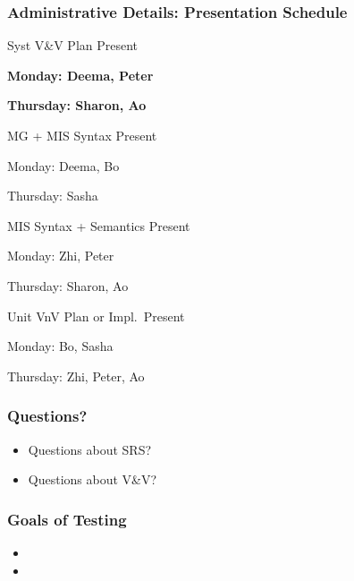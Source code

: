 \documentclass[t,12pt,numbers,fleqn]{beamer}
\begin{document}
\begin{frame}
\frametitle{Administrative Details: Presentation Schedule}

\bi
\item Syst V\&V Plan Present
\bi
\item \textbf{Monday: Deema, Peter}
\item \textbf{Thursday: Sharon, Ao}
\ei
\item MG + MIS Syntax Present
\bi
\item Monday:  Deema, Bo
\item Thursday: Sasha
\ei
\item MIS Syntax + Semantics Present
\bi
\item Monday: Zhi, Peter
\item Thursday:  Sharon, Ao
\ei
\item Unit VnV Plan or Impl.\ Present
\bi
\item Monday: Bo, Sasha
\item Thursday: Zhi, Peter, Ao
\ei
\ei

\end{frame}


\begin{frame}
\frametitle{Questions?}
\begin{itemize}
\item Questions about SRS?
\item Questions about V\&V?
\end{itemize}
\end{frame}


\begin{frame}
\frametitle{Goals of Testing}

\begin{itemize}

\item {}
\item {}

\end{itemize}

\end{frame}

\end{document}
